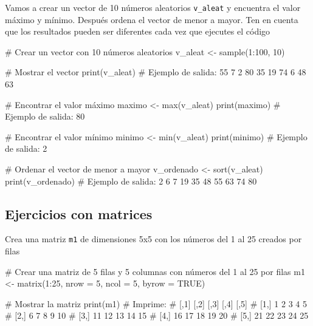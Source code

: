 \documentclass[
  letterpaper,
]{scrbook}
\newenvironment{Shaded}{\begin{snugshade}}{\end{snugshade}}
\newcommand{\AttributeTok}[1]{\textcolor[rgb]{0.40,0.45,0.13}{#1}}
\newcommand{\CommentTok}[1]{\textcolor[rgb]{0.37,0.37,0.37}{#1}}
\newcommand{\ConstantTok}[1]{\textcolor[rgb]{0.56,0.35,0.01}{#1}}
\newcommand{\DecValTok}[1]{\textcolor[rgb]{0.68,0.00,0.00}{#1}}
\newcommand{\FunctionTok}[1]{\textcolor[rgb]{0.28,0.35,0.67}{#1}}
\newcommand{\NormalTok}[1]{\textcolor[rgb]{0.00,0.23,0.31}{#1}}
\newcommand{\OtherTok}[1]{\textcolor[rgb]{0.00,0.23,0.31}{#1}}
\newcommand{\SpecialCharTok}[1]{\textcolor[rgb]{0.37,0.37,0.37}{#1}}
\begin{document}
Vamos a crear un vector de 10 números aleatorios \texttt{v\_aleat} y
encuentra el valor máximo y mínimo. Después ordena el vector de menor a
mayor. Ten en cuenta que los resultados pueden ser diferentes cada vez
que ejecutes el código

\begin{Shaded}
\begin{Highlighting}[]
\CommentTok{\# Crear un vector con 10 números aleatorios}
\NormalTok{v\_aleat }\OtherTok{\textless{}{-}} \FunctionTok{sample}\NormalTok{(}\DecValTok{1}\SpecialCharTok{:}\DecValTok{100}\NormalTok{, }\DecValTok{10}\NormalTok{)}

\CommentTok{\# Mostrar el vector}
\FunctionTok{print}\NormalTok{(v\_aleat)}
\CommentTok{\# Ejemplo de salida: 55  7  2  80 35 19 74  6 48 63}

\CommentTok{\# Encontrar el valor máximo}
\NormalTok{maximo }\OtherTok{\textless{}{-}} \FunctionTok{max}\NormalTok{(v\_aleat)}
\FunctionTok{print}\NormalTok{(maximo)}
\CommentTok{\# Ejemplo de salida: 80}

\CommentTok{\# Encontrar el valor mínimo}
\NormalTok{minimo }\OtherTok{\textless{}{-}} \FunctionTok{min}\NormalTok{(v\_aleat)}
\FunctionTok{print}\NormalTok{(minimo)}
\CommentTok{\# Ejemplo de salida: 2}

\CommentTok{\# Ordenar el vector de menor a mayor}
\NormalTok{v\_ordenado }\OtherTok{\textless{}{-}} \FunctionTok{sort}\NormalTok{(v\_aleat)}
\FunctionTok{print}\NormalTok{(v\_ordenado)}
\CommentTok{\# Ejemplo de salida: 2  6  7 19 35 48 55 63 74 80}
\end{Highlighting}
\end{Shaded}

\hypertarget{ejercicios-con-matrices-1}{%
\subsection{Ejercicios con matrices}\label{ejercicios-con-matrices-1}}

Crea una matriz \texttt{m1} de dimensiones 5x5 con los números del 1 al
25 creados por filas

\begin{Shaded}
\begin{Highlighting}[]
\CommentTok{\# Crear una matriz de 5 filas y 5 columnas con números del 1 al 25 por filas}
\NormalTok{m1 }\OtherTok{\textless{}{-}} \FunctionTok{matrix}\NormalTok{(}\DecValTok{1}\SpecialCharTok{:}\DecValTok{25}\NormalTok{, }\AttributeTok{nrow =} \DecValTok{5}\NormalTok{, }\AttributeTok{ncol =} \DecValTok{5}\NormalTok{, }\AttributeTok{byrow =} \ConstantTok{TRUE}\NormalTok{)}

\CommentTok{\# Mostrar la matriz}
\FunctionTok{print}\NormalTok{(m1)}
\CommentTok{\# Imprime:}
\CommentTok{\#      [,1] [,2] [,3] [,4] [,5]}
\CommentTok{\# [1,]    1    2    3    4    5}
\CommentTok{\# [2,]    6    7    8    9   10}
\CommentTok{\# [3,]   11   12   13   14   15}
\CommentTok{\# [4,]   16   17   18   19   20}
\CommentTok{\# [5,]   21   22   23   24   25}
\end{Highlighting}
\end{Shaded}
\end{document}
